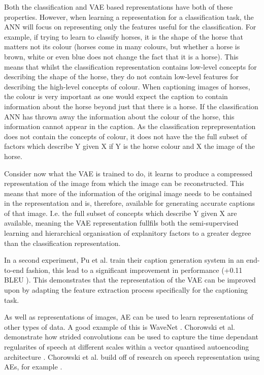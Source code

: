 Both the classification and \ac{VAE} based representations have both of these properties. However, when learning a representation for a classification task, the \ac{ANN} will focus on representing only the features useful for the classification. For example, if trying to learn to classify horses, it is the shape of the horse that matters not its colour (horses come in many colours, but whether a horse is brown, white or even blue does not change the fact that it is a horse). This means that whilst the classification representation contains low-level concepts for describing the shape of the horse, they do not contain low-level features for describing the high-level concepts of colour.
When captioning images of horses, the colour is very important as one would expect the caption to contain information about the horse beyond just that there is a horse. If the classification \ac{ANN} has thrown away the information about the colour of the horse, this information cannot appear in the caption. As the classification reprepresentation does not contain the concepts of colour, it does not have the the full subset of factors which describe Y given X if Y is the horse colour and X the image of the horse.

Consider now what the \ac{VAE} is trained to do, it learns to produce a compressed representation of the image from which the image can be reconstructed. This means that more of the information of the original image needs to be contained in the representation and is, therefore, available for generating accurate captions of that image. I.e. the full subset of concepts which describe Y given X are available, meaning the \ac{VAE} representation fullfils both the semi-supervised learning and hierarchical organisation of explanitory factors to a greater degree than the classification representation.

In a second experiment, Pu et al. train their caption generation system in an end-to-end fashion, this lead to a significant improvement in performance (+0.11 BLEU \cite{bleu}). This demonstrates that the representation of the \ac{VAE} can be improved upon by adapting the feature extraction process specifically for the captioning task.


As well as representations of images, \ac{AE} can be used to learn representations of other types of data. A good example of this is WaveNet \cite{wavenet}. Chorowski et al. demonstrate how strided convolutions \cite{radford2015unsupervised} can be used to capture the time dependant regularites of speech at different scales within a vector quantised autoencoding architecture \cite{van2017neural}. Chorowski et al. build off of research on speech representation using \acp{AE}, for example \cite{vincent2010stacked, lu2013speech}.

